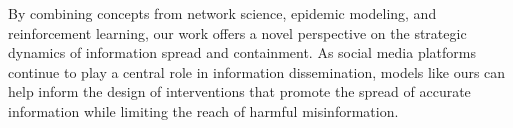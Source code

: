 \documentclass[12pt]{article}
\begin{document}
By combining concepts from network science, epidemic modeling, and reinforcement learning, our work offers a novel perspective on the strategic dynamics of information spread and containment. As social media platforms continue to play a central role in information dissemination, models like ours can help inform the design of interventions that promote the spread of accurate information while limiting the reach of harmful misinformation.



\end{document}
